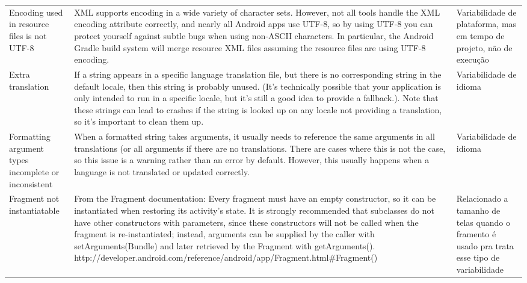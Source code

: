 \begin{landscape}
\begin{longtable}{p{30mm}|p{180mm}|p{25mm}}
Encoding used in resource files is not UTF-8
&XML supports encoding in a wide variety of character sets. However, not all tools handle the XML encoding attribute correctly, and nearly all Android apps use UTF-8, so by using UTF-8 you can protect yourself against subtle bugs when using non-ASCII characters. In particular, the Android Gradle build system will merge resource XML files assuming the resource files are using UTF-8 encoding.
&Variabilidade de plataforma, mas em tempo de projeto, não de execução\\

Extra translation
&If a string appears in a specific language translation file, but there is no corresponding string in the default locale, then this string is probably unused. (It's technically possible that your application is only intended to run in a specific locale, but it's still a good idea to provide a fallback.). Note that these strings can lead to crashes if the string is looked up on any locale not providing a translation, so it's important to clean them up.
&Variabilidade de idioma\\

Formatting argument types incomplete or inconsistent
&When a formatted string takes arguments, it usually needs to reference the same arguments in all translations (or all arguments if there are no translations. There are cases where this is not the case, so this issue is a warning rather than an error by default. However, this usually happens when a language is not translated or updated correctly.
&Variabilidade de idioma\\

Fragment not instantiatable
&From the Fragment documentation: Every fragment must have an empty constructor, so it can be instantiated when restoring its activity's state. It is strongly recommended that subclasses do not have other constructors with parameters, since these constructors will not be called when the fragment is re-instantiated; instead, arguments can be supplied by the caller with setArguments(Bundle) and later retrieved by the Fragment with getArguments(). http://developer.android.com/reference/android/app/Fragment.html\#Fragment()
&Relacionado a tamanho de telas quando o framento é usado pra trata esse tipo de variabilidade\\


\end{longtable}
\end{landscape}
